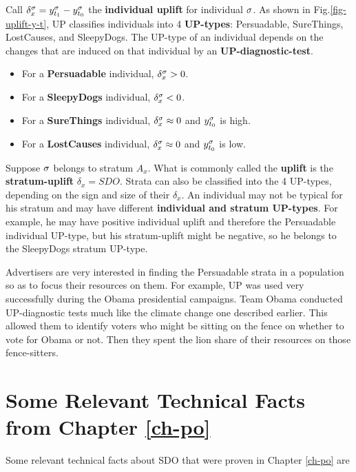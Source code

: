 Call $\delta^\sigma_x=
y^\sigma_{t_1}-y^\sigma_{t_0}$ the {\bf individual uplift}
for individual $\sigma$.
As shown
in Fig.\ref{fig-uplift-y-t},
UP classifies individuals
into 4 {\bf UP-types}: Persuadable, SureThings, LostCauses,
and SleepyDogs.
The UP-type
of an individual
depends on the changes 
that are induced on that individual
by an {\bf UP-diagnostic-test}.
\begin{itemize}
\item
For a {\bf Persuadable} individual,
$\delta^\sigma_x>0$.
\item
For a {\bf SleepyDogs}
individual, $\delta^\sigma_x< 0$.
\item
For a {\bf SureThings} individual,
 $\delta^\sigma_x\approx 0$
and $y^\sigma_{t_0}$ is high.
\item
For a {\bf LostCauses} individual,
$\delta^\sigma_x\approx 0$
and $y^\sigma_{t_0}$ is low.
\end{itemize}


Suppose $\sigma$
belongs to
stratum $A_x$.
What is commonly called 
the {\bf uplift} 
is the {\bf stratum-uplift} $\delta_x=SDO$.
Strata can also be
classified into
the 4 UP-types,
depending on the sign and size  
of their $\delta_x$.
An individual 
may not be typical for
his stratum
and may
have different
{\bf individual and stratum UP-types}.
For example, he may have positive 
individual uplift
and therefore the Persuadable individual UP-type,
but his stratum-uplift
might be negative, so
he belongs to
the SleepyDogs stratum UP-type.

Advertisers are very interested in finding
the Persuadable strata in a population
so as to focus their resources on them.
For example, UP was used very
successfully during the 
Obama presidential campaigns. 
Team Obama conducted UP-diagnostic
tests much like
the climate change one described earlier.
This allowed them to
identify voters who might be sitting on the fence
on whether to vote for Obama or not.
Then they spent
the lion share
of their resources  on those
fence-sitters.


\section{Some Relevant Technical Facts from Chapter \ref{ch-po}}
Some relevant technical facts
about SDO
that were proven in Chapter \ref{ch-po} are

